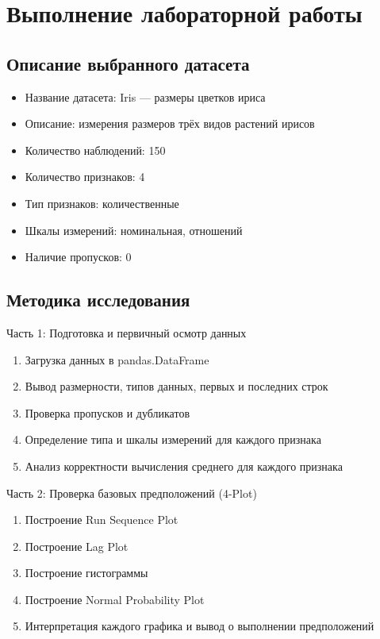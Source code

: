 \newpage

\section{Выполнение лабораторной работы} 

\subsection{Описание выбранного датасета}

\begin{itemize}
    \item Название датасета: Iris — размеры цветков ириса
\item Описание: измерения размеров трёх видов растений ирисов
\item Количество наблюдений: 150
\item Количество признаков: 4
\item Тип признаков: количественные
\item Шкалы измерений: номинальная, отношений
\item Наличие пропусков: 0
\end{itemize}

\subsection{Методика исследования}

Часть 1: Подготовка и первичный осмотр данных

\begin{enumerate}
    \item Загрузка данных в pandas.DataFrame
\item Вывод размерности, типов данных, первых и последних строк
\item Проверка пропусков и дубликатов
\item Определение типа и шкалы измерений для каждого признака
\item Анализ корректности вычисления среднего для каждого признака
\end{enumerate}

Часть 2: Проверка базовых предположений (4-Plot)
\begin{enumerate}
    \item Построение Run Sequence Plot
    \item Построение Lag Plot
    \item Построение гистограммы
    \item Построение Normal Probability Plot
    \item Интерпретация каждого графика и вывод о выполнении предположений
\end{enumerate}



